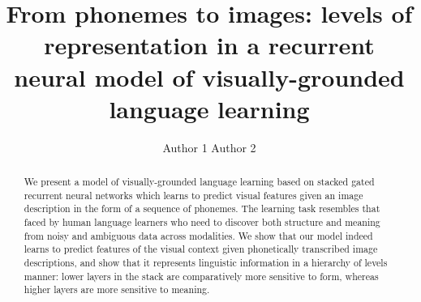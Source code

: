 \documentclass[11pt]{article}
\title{From phonemes to images: levels of representation in a recurrent neural
model of visually-grounded language learning}
\author{Author 1 \And Author 2}
\date{}
\begin{document}
\maketitle
\begin{abstract}
We present a model of visually-grounded language learning based on stacked gated recurrent neural networks which learns to predict visual features given an image description in the form of a sequence of phonemes. The learning task resembles that faced by human language learners who need to discover both structure and meaning from noisy and ambiguous data across modalities. We show that our model indeed learns to predict features of the visual context given phonetically transcribed image descriptions, and show that it represents linguistic information in a hierarchy of levels manner: lower layers in the stack are comparatively more sensitive to form, whereas higher layers are more sensitive to meaning.
\end{abstract}












\end{document}
